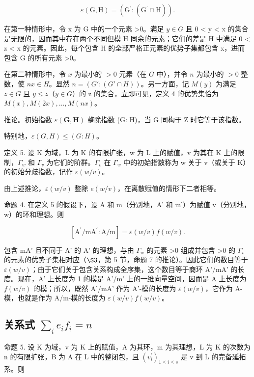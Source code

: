 \[
\varepsilon (\mathrm{G}, \mathrm{H}) = (\mathrm{G} ^ {\prime}: (\mathrm{G} ^ {\prime} \cap \mathrm{H})).
\]

在第一种情形中，令 x 为 G 中的一个元素 \textgreater0。满足 \(y \in G\) 且 0 \textless{} y \textless{} x 的集合是无限的，因而其中存在两个不同但模 H 同余的元素；它们的差是 H 中满足 0 \textless{} z \textless{} x 的元素。因此，每个包含 H 的全部严格正元素的优势子集都包含 x，进而包含 G 的所有元素 \textgreater0。

在第二种情形中，令 \(x\) 为最小的 \(>0\) 元素（在 \(G\) 中），并令 \(n\) 为最小的 \(>0\) 整数，使 \(nx \in H\)。显然 \(n = (G': (G' \cap H))\)。另一方面，记 \(M(y)\) 为满足 \(z \in G\) 且 \(y \leqslant z\)（\(y \in G\)）的 z 的集合，立即可见，定义 4 的优势集恰为 \(M(x), M(2x), \ldots, M(nx)\)。

推论。初始指数 \(\varepsilon(\mathbf{G},\mathbf{H})\) 整除指数 (G: H)，当 G 同构于 Z 时它等于该指数。

特别地，\(\varepsilon(G, H) \leqslant (G: H)\)。

定义 5. 设 K 为域，L 为 K 的有限扩张，w 为 L 上的赋值，v 为其在 K 上的限制，\(\Gamma_{w}\) 和 \(\Gamma_{v}\) 为它们的阶群。\(\Gamma_{v}\) 在 \(\Gamma_{w}\) 中的初始指数称为 w 关于 v（或关于 K）的初始分歧指数，记作 \(\varepsilon(w/v)\)。

由上述推论，\(\varepsilon(w/v)\) 整除 \(e(w/v)\)，在离散赋值的情形下二者相等。

命题 4. 在定义 5 的假设下，设 A 和 m（分别地，A' 和 m'）为赋值 v（分别地，w）的环和理想。则

\[
[ \mathrm{A} ^ {\prime} / \mathrm{mA} ^ {\prime}: \mathrm{A} / \mathrm{m} ] = \varepsilon (w / v) f (w / v).
\]

包含 mA' 且不同于 A' 的 A' 的理想，与由 \(\Gamma_{w}\) 的元素 \textgreater0 组成并包含 \textgreater0 的 \(\Gamma_{v}\) 的元素的优势子集相对应（\(\S3\)，第 5 节，命题 7 的推论）。因此它们的数目等于 \(\varepsilon(w/v)\)；由于它们关于包含关系构成全序集，这个数目等于商环 A'/mA' 的长度。现在，A' 上长度为 1 的模是 A'/m' 上的一维向量空间，因而是 A 上长度为 \(f(w/v)\) 的模；所以，既然 A'/mA' 作为 A'-模的长度为 \(\varepsilon(w/v)\)，它作为 A-模，也就是作为 A/m-模的长度为 \(\varepsilon(w/v)f(w/v)\)。

\subsection{\texorpdfstring{关系式 \(\sum_{i} e_{i} f_{i} = n\)}{关系式 Σ ei fi = n}}

命题 5. 设 K 为域，v 为 K 上的赋值，A 为其环，m 为其理想，L 为 K 的次数为 n 的有限扩张，B 为 A 在 L 中的整闭包，且 \((v_{i}^{\prime})_{1 \leq i \leq s}\) 是 v 到 L 的完备延拓系。则


